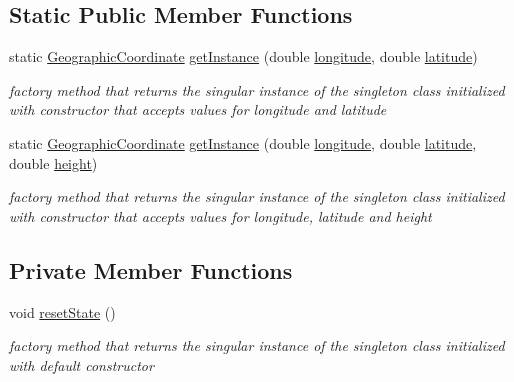\subsection*{Static Public Member Functions}
\begin{DoxyCompactItemize}
\item 
static \hyperlink{classcoordinates_1_1_geographic_coordinate}{Geographic\+Coordinate} \hyperlink{classcoordinates_1_1_geographic_coordinate_a29ced8017420b012f7bd5749ed6ba600}{get\+Instance} (double \hyperlink{classcoordinates_1_1_geographic_coordinate_a1ffbbfc5c01ab766af1d32bcc8cb42ad}{longitude}, double \hyperlink{classcoordinates_1_1_geographic_coordinate_a07a18abcc3cd691d4d8821a875dabbd6}{latitude})
\begin{DoxyCompactList}\small\item\em factory method that returns the singular instance of the singleton class initialized with constructor that accepts values for longitude and latitude \end{DoxyCompactList}\item 
static \hyperlink{classcoordinates_1_1_geographic_coordinate}{Geographic\+Coordinate} \hyperlink{classcoordinates_1_1_geographic_coordinate_afa986233325df2fb8a8b47d4ddeaee46}{get\+Instance} (double \hyperlink{classcoordinates_1_1_geographic_coordinate_a1ffbbfc5c01ab766af1d32bcc8cb42ad}{longitude}, double \hyperlink{classcoordinates_1_1_geographic_coordinate_a07a18abcc3cd691d4d8821a875dabbd6}{latitude}, double \hyperlink{classcoordinates_1_1_geographic_coordinate_a928334b65b117d99cd724d2c0b9b7ee0}{height})
\begin{DoxyCompactList}\small\item\em factory method that returns the singular instance of the singleton class initialized with constructor that accepts values for longitude, latitude and height \end{DoxyCompactList}\end{DoxyCompactItemize}
\subsection*{Private Member Functions}
\begin{DoxyCompactItemize}
\item 
void \hyperlink{classcoordinates_1_1_geographic_coordinate_ae489c187a21fc058b5af3d7d7ff1e5e7}{reset\+State} ()
\begin{DoxyCompactList}\small\item\em factory method that returns the singular instance of the singleton class initialized with default constructor \end{DoxyCompactList}\end{DoxyCompactItemize}

